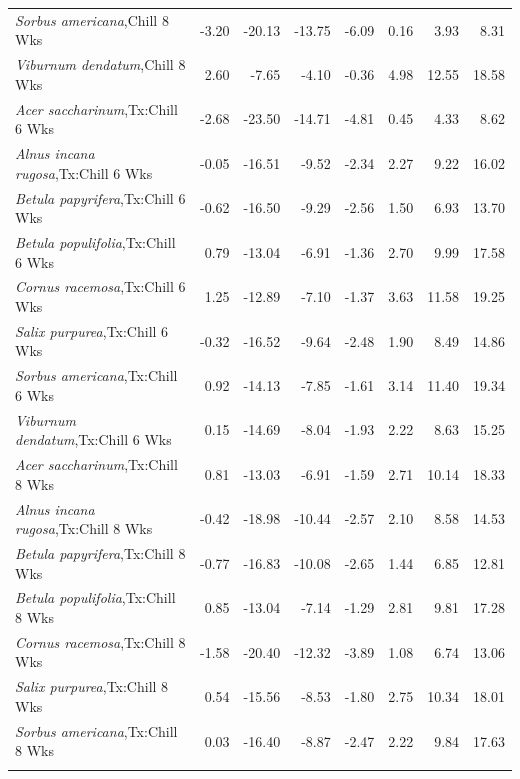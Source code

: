 \documentclass{article}\usepackage[]{graphicx}\usepackage[]{color}
\begin{document}
\begin{longtable}{lrrrrrrr}
  \textit{Sorbus americana},Chill 8 Wks & -3.20 & -20.13 & -13.75 & -6.09 & 0.16 & 3.93 & 8.31 \\ 
  \textit{Viburnum dendatum},Chill 8 Wks & 2.60 & -7.65 & -4.10 & -0.36 & 4.98 & 12.55 & 18.58 \\ 
  \textit{Acer saccharinum},Tx:Chill 6 Wks & -2.68 & -23.50 & -14.71 & -4.81 & 0.45 & 4.33 & 8.62 \\ 
  \textit{Alnus incana rugosa},Tx:Chill 6 Wks & -0.05 & -16.51 & -9.52 & -2.34 & 2.27 & 9.22 & 16.02 \\ 
  \textit{Betula papyrifera},Tx:Chill 6 Wks & -0.62 & -16.50 & -9.29 & -2.56 & 1.50 & 6.93 & 13.70 \\ 
  \textit{Betula populifolia},Tx:Chill 6 Wks & 0.79 & -13.04 & -6.91 & -1.36 & 2.70 & 9.99 & 17.58 \\ 
  \textit{Cornus racemosa},Tx:Chill 6 Wks & 1.25 & -12.89 & -7.10 & -1.37 & 3.63 & 11.58 & 19.25 \\ 
  \textit{Salix purpurea},Tx:Chill 6 Wks & -0.32 & -16.52 & -9.64 & -2.48 & 1.90 & 8.49 & 14.86 \\ 
  \textit{Sorbus americana},Tx:Chill 6 Wks & 0.92 & -14.13 & -7.85 & -1.61 & 3.14 & 11.40 & 19.34 \\ 
  \textit{Viburnum dendatum},Tx:Chill 6 Wks & 0.15 & -14.69 & -8.04 & -1.93 & 2.22 & 8.63 & 15.25 \\ 
  \textit{Acer saccharinum},Tx:Chill 8 Wks & 0.81 & -13.03 & -6.91 & -1.59 & 2.71 & 10.14 & 18.33 \\ 
  \textit{Alnus incana rugosa},Tx:Chill 8 Wks & -0.42 & -18.98 & -10.44 & -2.57 & 2.10 & 8.58 & 14.53 \\ 
  \textit{Betula papyrifera},Tx:Chill 8 Wks & -0.77 & -16.83 & -10.08 & -2.65 & 1.44 & 6.85 & 12.81 \\ 
  \textit{Betula populifolia},Tx:Chill 8 Wks & 0.85 & -13.04 & -7.14 & -1.29 & 2.81 & 9.81 & 17.28 \\ 
  \textit{Cornus racemosa},Tx:Chill 8 Wks & -1.58 & -20.40 & -12.32 & -3.89 & 1.08 & 6.74 & 13.06 \\ 
  \textit{Salix purpurea},Tx:Chill 8 Wks & 0.54 & -15.56 & -8.53 & -1.80 & 2.75 & 10.34 & 18.01 \\ 
  \textit{Sorbus americana},Tx:Chill 8 Wks & 0.03 & -16.40 & -8.87 & -2.47 & 2.22 & 9.84 & 17.63 \\ 
   \hline
\hline
\label{tab:suppmodgs}
\end{longtable}
\end{document}
